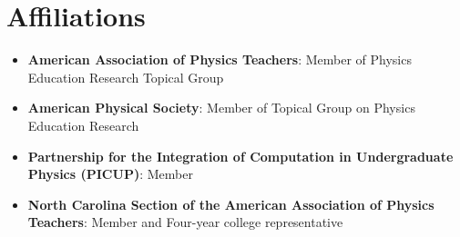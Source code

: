 \section{Affiliations}

\begin{itemize}[leftmargin=0.15in, label={}]
  \item \textbf{American Association of Physics Teachers}: Member of Physics Education Research
  Topical Group
  \item \textbf{American Physical Society}: Member of Topical Group on Physics Education
  Research
  \item \textbf{Partnership for the Integration of Computation in Undergraduate Physics
    (PICUP)}: Member
  \item \textbf{North Carolina Section of the American Association of Physics Teachers}: Member
  and Four-year college representative
\end{itemize}
